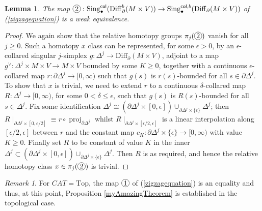 \documentclass[a4paper, oneside]{amsart}
\newtheorem{lemma}[theorem]{Lemma}
\newcommand{\diff}{\mathrm{Diff}}
\newcommand{\1}{\mathds{1}}
\newcommand{\Sing}{\operatorname{Sing}}
\newcommand*\circled[1]{\tikz[baseline=(char.base)]{%
            \node[shape=circle,draw,inner sep=1pt] (char) {#1};}}
\theoremstyle{remark}
\newtheorem{remark}[theorem]{Remark}
\theoremstyle{definition}
\numberwithin{equation}{section}
\begin{document}
\begin{lemma}
    The map $\circled{2}:\Sing^{\mathsf{col}}_\bullet(\diff^b_\partial(M\times V))\to \Sing^{\mathsf{col}, b}_\bullet(\diff_\partial(M\times V))$ of (\ref{zigzagequation}) is a weak equivalence.
\end{lemma}
\begin{proof}
    We again show that the relative homotopy groups $\pi_j(\circled{2})$ vanish for all $j\geq 0$. Such a homotopy $x$ class can be represented, for some $\epsilon>0$, by an $\epsilon$-collared singular $j$-simplex $g:\Delta^j\to \diff_\partial(M\times V)$, adjoint to a map $g^\vee: \Delta^j\times M\times V\to M\times V$ bounded by some $K\geq 0$, together with a continuous $\epsilon$-collared map $r:\partial\Delta^j\to [0,\infty)$ such that $g(s)$ is $r(s)$-bounded for all $s\in \partial\Delta^j$. To show that $x$ is trivial, we need to extend $r$ to a continuous $\delta$-collared map $R: \Delta^j\to [0,\infty)$, for some $0<\delta\leq \epsilon$, such that $g(s)$ is $R(s)$-bounded for all $s\in \Delta^j$. Fix some identification $\Delta^j\cong (\partial\Delta^j\times[0,\epsilon])\cup_{\partial\Delta^j\times\{\epsilon\}}\Delta^j$; then $R\mid_{\partial\Delta^j\times[0,\epsilon/2]}\equiv r\circ\operatorname{proj}_{\partial\Delta^j}$ whilst $R\mid_{\partial\Delta^j\times[\epsilon/2,\epsilon]}$ is a linear interpolation along $[\epsilon/2,\epsilon]$ between $r$ and the constant map $c_{K}:\partial\Delta^j\times\{\epsilon\}\to [0,\infty)$ with value $K\geq 0$. Finally set $R$ to be constant of value $K$ in the inner $\Delta^j\subset (\partial\Delta^j\times[0,\epsilon])\cup_{\partial\Delta^j\times\{\epsilon\}}\Delta^j$. Then $R$ is as required, and hence the relative homotopy class $x\in \pi_j(\circled{2})$ is trivial.
\end{proof}


\begin{remark}\label{TOPsimplicialrem}
    For $CAT=\mathrm{Top}$, the map $\circled{1}$ of (\ref{zigzagequation}) is an equality and thus, at this point, Proposition \ref{myAmazingTheorem} is established in the topological case. 
\end{remark}
\end{document}
